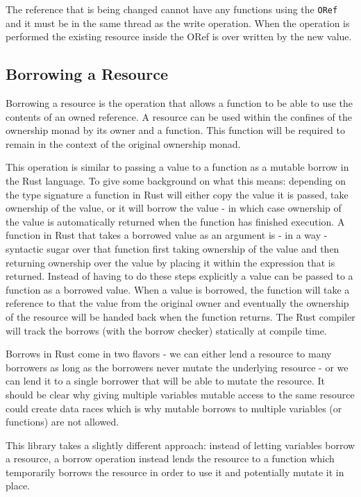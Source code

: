 \documentclass[onehalf,11pt]{beavtex}
\begin{document}
The reference that is being changed cannot have any functions using the
\texttt{ORef} and it must be in the same thread as the write operation.
When the operation is performed the existing resource inside the ORef is over
written by the new value.

\subsection{Borrowing a Resource}

Borrowing a resource is the operation that allows a function to be able to use
the contents of an owned reference.
A resource can be used within the confines of the ownership monad by its owner
and a function. This function will be required to remain in the
context of the original ownership monad.

This operation is similar to passing a value to a function as a mutable
borrow in the Rust language.
To give some background on what this means:
depending on the type signature a function in Rust will either copy the value
it is passed, take ownership of the value, or it will borrow the value - in
which case ownership of the value is automatically returned when the function
has finished execution.\cite{rust_book_ownership}
A function in Rust that takes a borrowed value as an argument is - in a way -
syntactic sugar over that function first taking ownership of the value and then
returning ownership over the value by placing it within the expression that is
returned.
Instead of having to do these steps explicitly a value can be passed to a
function as a borrowed value.  When a value is borrowed, the function will take
a reference to that the value from the original owner and eventually the
ownership of the resource will be handed back when the function returns.
The Rust compiler will track the borrows (with the borrow checker) statically at
compile time.

Borrows in Rust come in two flavors - we can either lend a resource to many
borrowers as long as the borrowers never mutate the underlying resource - or we
can lend it to a single borrower that will be able to mutate the
resource.\cite{rust_book_borrowing}
It should be clear why giving multiple variables mutable access to
the same resource could create data races which is why mutable borrows to
multiple variables (or functions) are not allowed.

This library takes a slightly different approach: instead of letting variables
borrow a resource, a borrow operation instead lends the resource to a function
which temporarily borrows the resource in order to use it and potentially mutate
it in place.
\end{document}
